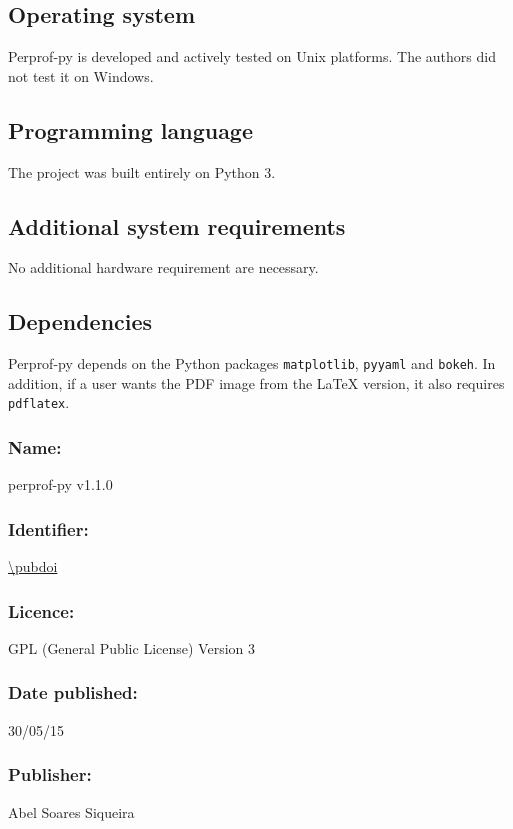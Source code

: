 \subsection*{Operating system}

    Perprof-py is developed and actively tested on Unix platforms.
    The authors did not test it on Windows.

\subsection*{Programming language}

    The project was built entirely on Python 3.

\subsection*{Additional system requirements}

    No additional hardware requirement are necessary.

\subsection*{Dependencies}

    Perprof-py depends on the Python packages \texttt{matplotlib}, \texttt{pyyaml} and \texttt{bokeh}.
    In addition, if a user wants the PDF image from the LaTeX
    version, it also requires \texttt{pdflatex}.

\Archive

    \subsubsection*{Name:} perprof-py v1.1.0

    \subsubsection*{Identifier:} \url{\pubdoi}

    \subsubsection*{Licence:} GPL (General Public License) Version 3

    \subsubsection*{Date published:} 30/05/15

    \subsubsection*{Publisher:} Abel Soares Siqueira


